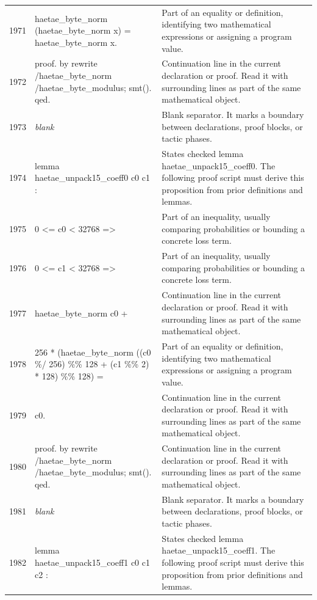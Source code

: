 \documentclass[10pt]{article}
\begin{document}
\begin{longtable}{r L{0.53\textwidth} L{0.37\textwidth}}
1971 & {\ttfamily\scriptsize   haetae\_byte\_norm (haetae\_byte\_norm x) = haetae\_byte\_norm x.} & Part of an equality or definition, identifying two mathematical expressions or assigning a program value. \\
1972 & {\ttfamily\scriptsize proof. by rewrite /haetae\_byte\_norm /haetae\_byte\_modulus; smt(). qed.} & Continuation line in the current declaration or proof.  Read it with surrounding lines as part of the same mathematical object. \\
1973 & {\ttfamily\scriptsize \emph{blank}} & Blank separator.  It marks a boundary between declarations, proof blocks, or tactic phases. \\
1974 & {\ttfamily\scriptsize lemma haetae\_unpack15\_coeff0 c0 c1 :} & States checked lemma haetae\_unpack15\_coeff0.  The following proof script must derive this proposition from prior definitions and lemmas. \\
1975 & {\ttfamily\scriptsize   0 <= c0 < 32768 =>} & Part of an inequality, usually comparing probabilities or bounding a concrete loss term. \\
1976 & {\ttfamily\scriptsize   0 <= c1 < 32768 =>} & Part of an inequality, usually comparing probabilities or bounding a concrete loss term. \\
1977 & {\ttfamily\scriptsize   haetae\_byte\_norm c0 +} & Continuation line in the current declaration or proof.  Read it with surrounding lines as part of the same mathematical object. \\
1978 & {\ttfamily\scriptsize     256 * (haetae\_byte\_norm ((c0 \%/ 256) \%\% 128 + (c1 \%\% 2) * 128) \%\% 128) =} & Part of an equality or definition, identifying two mathematical expressions or assigning a program value. \\
1979 & {\ttfamily\scriptsize   c0.} & Continuation line in the current declaration or proof.  Read it with surrounding lines as part of the same mathematical object. \\
1980 & {\ttfamily\scriptsize proof. by rewrite /haetae\_byte\_norm /haetae\_byte\_modulus; smt(). qed.} & Continuation line in the current declaration or proof.  Read it with surrounding lines as part of the same mathematical object. \\
1981 & {\ttfamily\scriptsize \emph{blank}} & Blank separator.  It marks a boundary between declarations, proof blocks, or tactic phases. \\
1982 & {\ttfamily\scriptsize lemma haetae\_unpack15\_coeff1 c0 c1 c2 :} & States checked lemma haetae\_unpack15\_coeff1.  The following proof script must derive this proposition from prior definitions and lemmas. \\

\end{longtable}
\end{document}
